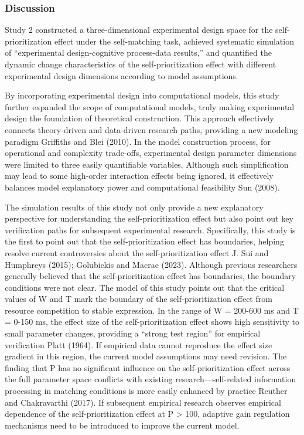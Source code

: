 \documentclass[
  english,
  man,floatsintext]{apa6}
\begin{document}
\subsubsection{Discussion}\label{discussion-1}

Study 2 constructed a three-dimensional experimental design space for the self-prioritization effect under the self-matching task, achieved systematic simulation of ``experimental design-cognitive process-data results,'' and quantified the dynamic change characteristics of the self-prioritization effect with different experimental design dimensions according to model assumptions.

By incorporating experimental design into computational models, this study further expanded the scope of computational models, truly making experimental design the foundation of theoretical construction. This approach effectively connects theory-driven and data-driven research paths, providing a new modeling paradigm Griffiths and Blei (2010). In the model construction process, for operational and complexity trade-offs, experimental design parameter dimensions were limited to three easily quantifiable variables. Although such simplification may lead to some high-order interaction effects being ignored, it effectively balances model explanatory power and computational feasibility Sun (2008).

The simulation results of this study not only provide a new explanatory perspective for understanding the self-prioritization effect but also point out key verification paths for subsequent experimental research. Specifically, this study is the first to point out that the self-prioritization effect has boundaries, helping resolve current controversies about the self-prioritization effect J. Sui and Humphreys (2015); Golubickis and Macrae (2023). Although previous researchers generally believed that the self-prioritization effect has boundaries, the boundary conditions were not clear. The model of this study points out that the critical values of W and T mark the boundary of the self-prioritization effect from resource competition to stable expression. In the range of W = 200-600 ms and T = 0-150 ms, the effect size of the self-prioritization effect shows high sensitivity to small parameter changes, providing a ``strong test region'' for empirical verification Platt (1964). If empirical data cannot reproduce the effect size gradient in this region, the current model assumptions may need revision. The finding that P has no significant influence on the self-prioritization effect across the full parameter space conflicts with existing research---self-related information processing in matching conditions is more easily enhanced by practice Reuther and Chakravarthi (2017). If subsequent empirical research observes empirical dependence of the self-prioritization effect at P \textgreater{} 100, adaptive gain regulation mechanisms need to be introduced to improve the current model.
\end{document}
